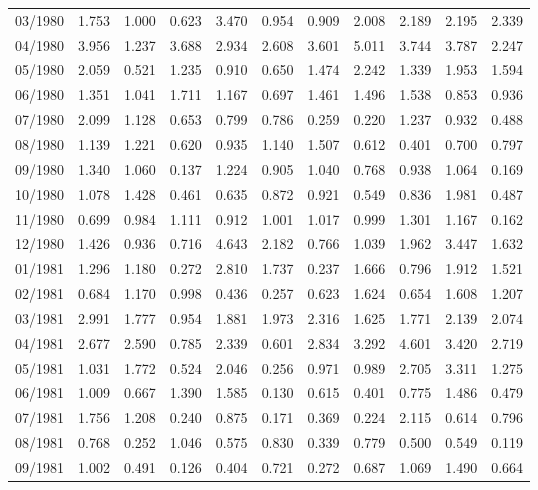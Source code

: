 \begin{tabular}{lrrrrrrrrrr}
03/1980 &  1.753 &  1.000 &  0.623 &  3.470 &  0.954 &  0.909 &  2.008 &  2.189 &  2.195 &  2.339 \\
04/1980 &  3.956 &  1.237 &  3.688 &  2.934 &  2.608 &  3.601 &  5.011 &  3.744 &  3.787 &  2.247 \\
05/1980 &  2.059 &  0.521 &  1.235 &  0.910 &  0.650 &  1.474 &  2.242 &  1.339 &  1.953 &  1.594 \\
06/1980 &  1.351 &  1.041 &  1.711 &  1.167 &  0.697 &  1.461 &  1.496 &  1.538 &  0.853 &  0.936 \\
07/1980 &  2.099 &  1.128 &  0.653 &  0.799 &  0.786 &  0.259 &  0.220 &  1.237 &  0.932 &  0.488 \\
08/1980 &  1.139 &  1.221 &  0.620 &  0.935 &  1.140 &  1.507 &  0.612 &  0.401 &  0.700 &  0.797 \\
09/1980 &  1.340 &  1.060 &  0.137 &  1.224 &  0.905 &  1.040 &  0.768 &  0.938 &  1.064 &  0.169 \\
10/1980 &  1.078 &  1.428 &  0.461 &  0.635 &  0.872 &  0.921 &  0.549 &  0.836 &  1.981 &  0.487 \\
11/1980 &  0.699 &  0.984 &  1.111 &  0.912 &  1.001 &  1.017 &  0.999 &  1.301 &  1.167 &  0.162 \\
12/1980 &  1.426 &  0.936 &  0.716 &  4.643 &  2.182 &  0.766 &  1.039 &  1.962 &  3.447 &  1.632 \\
01/1981 &  1.296 &  1.180 &  0.272 &  2.810 &  1.737 &  0.237 &  1.666 &  0.796 &  1.912 &  1.521 \\
02/1981 &  0.684 &  1.170 &  0.998 &  0.436 &  0.257 &  0.623 &  1.624 &  0.654 &  1.608 &  1.207 \\
03/1981 &  2.991 &  1.777 &  0.954 &  1.881 &  1.973 &  2.316 &  1.625 &  1.771 &  2.139 &  2.074 \\
04/1981 &  2.677 &  2.590 &  0.785 &  2.339 &  0.601 &  2.834 &  3.292 &  4.601 &  3.420 &  2.719 \\
05/1981 &  1.031 &  1.772 &  0.524 &  2.046 &  0.256 &  0.971 &  0.989 &  2.705 &  3.311 &  1.275 \\
06/1981 &  1.009 &  0.667 &  1.390 &  1.585 &  0.130 &  0.615 &  0.401 &  0.775 &  1.486 &  0.479 \\
07/1981 &  1.756 &  1.208 &  0.240 &  0.875 &  0.171 &  0.369 &  0.224 &  2.115 &  0.614 &  0.796 \\
08/1981 &  0.768 &  0.252 &  1.046 &  0.575 &  0.830 &  0.339 &  0.779 &  0.500 &  0.549 &  0.119 \\
09/1981 &  1.002 &  0.491 &  0.126 &  0.404 &  0.721 &  0.272 &  0.687 &  1.069 &  1.490 &  0.664 \\

\end{tabular}
